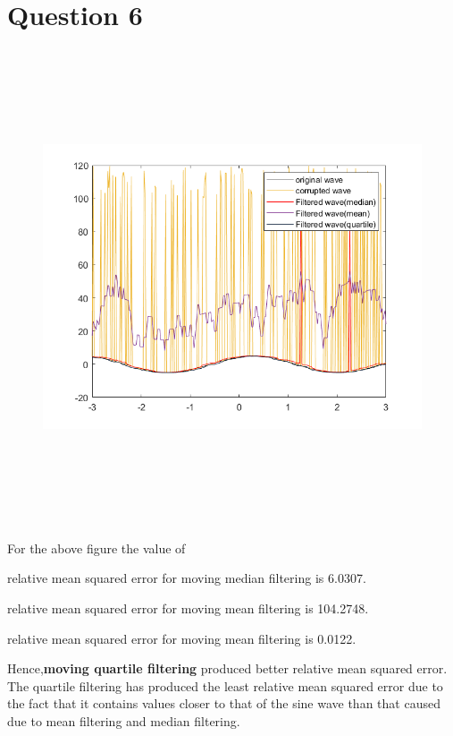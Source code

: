 \documentclass{article}
\begin{document}
\section*{Question 6}
\begin{figure}[H]
    {\includegraphics[width =19cm, height=14cm]{30per.png}}
\end{figure}
    For the above figure the value of \\
    \par 
    relative mean squared error for moving median filtering is 6.0307.
    \par 
    relative mean squared error for moving mean filtering is 104.2748.
    \par 
    relative mean squared error for moving mean filtering is 0.0122.
    \newline
    \par 
    \par 
    Hence,\textbf{moving quartile filtering} produced better relative mean squared error.\\
    The quartile filtering has produced the least relative mean squared error due to the fact that it contains values closer to that of the sine wave than that caused due to mean filtering and median filtering.
\end{document}
